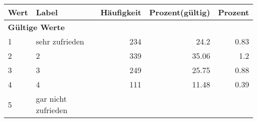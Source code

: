      \begin{longtable}{lXrrr}
     \toprule
     \textbf{Wert} & \textbf{Label} & \textbf{Häufigkeit} & \textbf{Prozent(gültig)} & \textbf{Prozent} \\
     \endhead
     \midrule
     \multicolumn{5}{l}{\textbf{Gültige Werte}}\\

     1 &
     \multicolumn{1}{X}{ sehr zufrieden   } &


       \num{234} &
       \num[round-mode=places,round-precision=2]{24.2} &
         \num[round-mode=places,round-precision=2]{0.83} \\

     2 &
     \multicolumn{1}{X}{ 2   } &


       \num{339} &
       \num[round-mode=places,round-precision=2]{35.06} &
         \num[round-mode=places,round-precision=2]{1.2} \\

     3 &
     \multicolumn{1}{X}{ 3   } &


       \num{249} &
       \num[round-mode=places,round-precision=2]{25.75} &
         \num[round-mode=places,round-precision=2]{0.88} \\

     4 &
     \multicolumn{1}{X}{ 4   } &


       \num{111} &
       \num[round-mode=places,round-precision=2]{11.48} &
         \num[round-mode=places,round-precision=2]{0.39} \\

     5 &
     \multicolumn{1}{X}{ gar nicht zufrieden   } &



\end{longtable}
